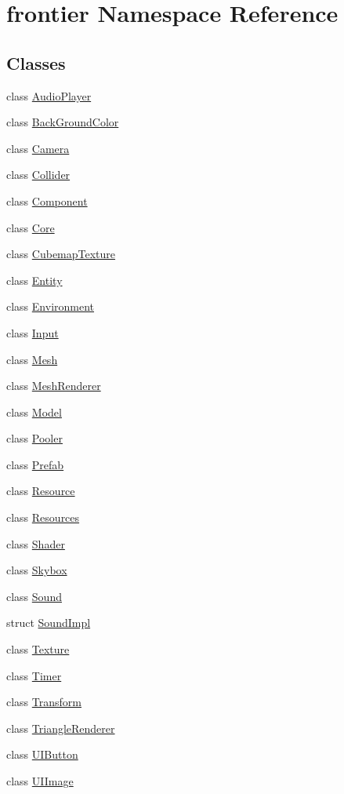 \hypertarget{namespacefrontier}{}\section{frontier Namespace Reference}
\label{namespacefrontier}
\subsection*{Classes}
\begin{DoxyCompactItemize}
\item 
class \hyperlink{classfrontier_1_1_audio_player}{Audio\+Player}
\item 
class \hyperlink{classfrontier_1_1_back_ground_color}{Back\+Ground\+Color}
\item 
class \hyperlink{classfrontier_1_1_camera}{Camera}
\item 
class \hyperlink{classfrontier_1_1_collider}{Collider}
\item 
class \hyperlink{classfrontier_1_1_component}{Component}
\item 
class \hyperlink{classfrontier_1_1_core}{Core}
\item 
class \hyperlink{classfrontier_1_1_cubemap_texture}{Cubemap\+Texture}
\item 
class \hyperlink{classfrontier_1_1_entity}{Entity}
\item 
class \hyperlink{classfrontier_1_1_environment}{Environment}
\item 
class \hyperlink{classfrontier_1_1_input}{Input}
\item 
class \hyperlink{classfrontier_1_1_mesh}{Mesh}
\item 
class \hyperlink{classfrontier_1_1_mesh_renderer}{Mesh\+Renderer}
\item 
class \hyperlink{classfrontier_1_1_model}{Model}
\item 
class \hyperlink{classfrontier_1_1_pooler}{Pooler}
\item 
class \hyperlink{classfrontier_1_1_prefab}{Prefab}
\item 
class \hyperlink{classfrontier_1_1_resource}{Resource}
\item 
class \hyperlink{classfrontier_1_1_resources}{Resources}
\item 
class \hyperlink{classfrontier_1_1_shader}{Shader}
\item 
class \hyperlink{classfrontier_1_1_skybox}{Skybox}
\item 
class \hyperlink{classfrontier_1_1_sound}{Sound}
\item 
struct \hyperlink{structfrontier_1_1_sound_impl}{Sound\+Impl}
\item 
class \hyperlink{classfrontier_1_1_texture}{Texture}
\item 
class \hyperlink{classfrontier_1_1_timer}{Timer}
\item 
class \hyperlink{classfrontier_1_1_transform}{Transform}
\item 
class \hyperlink{classfrontier_1_1_triangle_renderer}{Triangle\+Renderer}
\item 
class \hyperlink{classfrontier_1_1_u_i_button}{U\+I\+Button}
\item 
class \hyperlink{classfrontier_1_1_u_i_image}{U\+I\+Image}
\end{DoxyCompactItemize}
